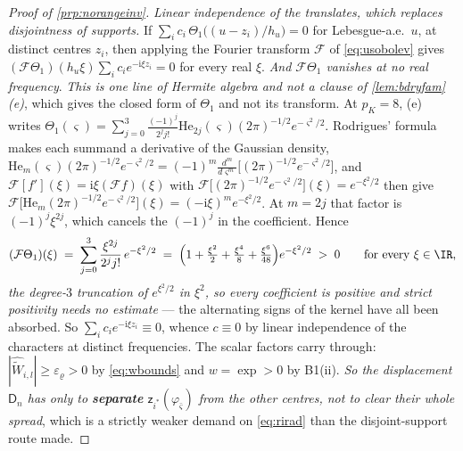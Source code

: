 \begin{proof}[Proof of \cref{prp:norangeinv}]
\emph{Linear independence of the translates, which replaces disjointness of supports.} If
$\sum_{i}c_i\,\Theta_1\big((u-z_i)/h_u\big)=0$ for Lebesgue-a.e.\ $u$, at distinct centres $z_i$, then
applying the Fourier transform $\mathcal F$ of \eqref{eq:usobolev} gives
$(\mathcal F\Theta_1)(h_u\xi)\sum_ic_ie^{-\mathrm i\xi z_i}=0$ for every real $\xi$. \emph{And
$\mathcal F\Theta_1$ vanishes at no real frequency}. \emph{This is one line of Hermite algebra and not a
clause of \cref{lem:bdryfam}\textup{(e)}}, which gives the closed form of $\Theta_1$ and not its
transform. At $p_K=8$, (e) writes $\Theta_1(\varsigma)=\sum_{j=0}^{3}\frac{(-1)^{j}}{2^{j}j!}
\mathrm{He}_{2j}(\varsigma)(2\pi)^{-1/2}e^{-\varsigma^{2}/2}$. Rodrigues' formula makes each summand a
derivative of the Gaussian density, $\mathrm{He}_m(\varsigma)(2\pi)^{-1/2}e^{-\varsigma^{2}/2}
=(-1)^{m}\frac{d^{m}}{d\varsigma^{m}}\big[(2\pi)^{-1/2}e^{-\varsigma^{2}/2}\big]$, and
$\mathcal F[f'](\xi)=\mathrm i\xi(\mathcal Ff)(\xi)$ with
$\mathcal F\big[(2\pi)^{-1/2}e^{-\varsigma^{2}/2}\big](\xi)=e^{-\xi^{2}/2}$ then give
$\mathcal F\big[\mathrm{He}_m(2\pi)^{-1/2}e^{-\varsigma^{2}/2}\big](\xi)=(-\mathrm i\xi)^{m}e^{-\xi^{2}/2}$.
At $m=2j$ that factor is $(-1)^{j}\xi^{2j}$, which cancels the $(-1)^{j}$ in the coefficient. Hence
\[
(\mathcal F\Theta_1)(\xi)\;=\;\sum_{j=0}^{3}\frac{\xi^{2j}}{2^{j}j!}\,e^{-\xi^{2}/2}
\;=\;\Big(1+\tfrac{\xi^{2}}{2}+\tfrac{\xi^{4}}{8}+\tfrac{\xi^{6}}{48}\Big)e^{-\xi^{2}/2}\;>\;0
\qquad\text{for every }\xi\in\IR ,
\]
\emph{the degree-$3$ truncation of $e^{\xi^{2}/2}$ in $\xi^{2}$, so every coefficient is positive and
strict positivity needs no estimate} --- the alternating signs of the kernel have all been absorbed.
So $\sum_ic_ie^{-\mathrm i\xi z_i}\equiv0$, whence $c\equiv0$ by linear independence of the characters
at distinct frequencies. The scalar factors carry through: $|\widehat{\widetilde W}_{i,l}|\ge\varepsilon_\varrho>0$
by \eqref{eq:wbounds} and $w=\exp>0$ by B1(ii). \emph{So the displacement $\mathsf D_n$ has only to
\textbf{separate} $\mathsf z_{i^\ast}(\varphi_{\bar\varsigma})$ from the other centres, not to clear
their whole spread}, which is a strictly weaker demand on \eqref{eq:rirad} than the disjoint-support
route made.


\end{proof}
